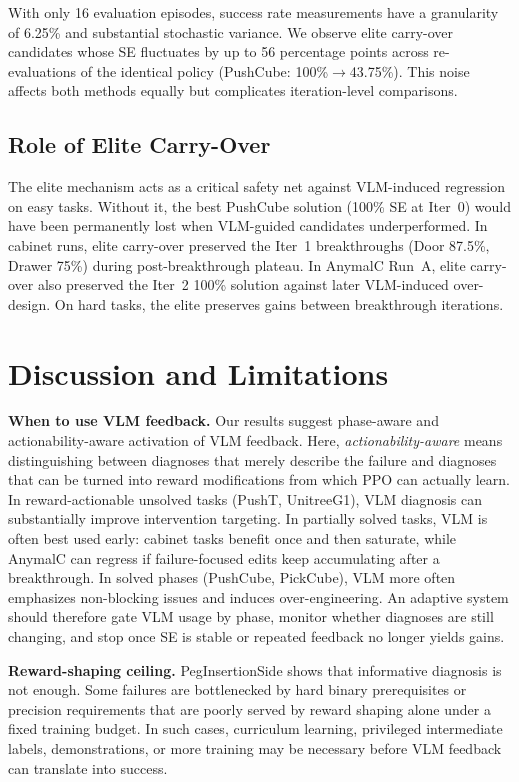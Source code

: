 \documentclass[conference]{IEEEtran}
\begin{document}
With only 16 evaluation episodes, success rate measurements have a granularity
of 6.25\% and substantial stochastic variance. We observe elite carry-over
candidates whose SE fluctuates by up to 56 percentage points across
re-evaluations of the identical policy (PushCube: 100\%$\to$43.75\%). This
noise affects both methods equally but complicates iteration-level comparisons.

\subsection{Role of Elite Carry-Over}

The elite mechanism acts as a critical safety net against VLM-induced regression
on easy tasks. Without it, the best PushCube solution (100\% SE at Iter~0) would
have been permanently lost when VLM-guided candidates underperformed. In cabinet
runs, elite carry-over preserved the Iter~1 breakthroughs (Door 87.5\%, Drawer
75\%) during post-breakthrough plateau. In AnymalC Run~A, elite carry-over also
preserved the Iter~2 100\% solution against later VLM-induced over-design. On
hard tasks, the elite preserves gains between breakthrough iterations.


\section{Discussion and Limitations}

\textbf{When to use VLM feedback.}
Our results suggest phase-aware and actionability-aware activation of VLM
feedback. Here, \emph{actionability-aware} means distinguishing between
diagnoses that merely describe the failure and diagnoses that can be turned into
reward modifications from which PPO can actually learn. In reward-actionable
unsolved tasks (PushT, UnitreeG1), VLM diagnosis can substantially improve
intervention targeting. In partially solved tasks, VLM is often best used
early: cabinet tasks benefit once and then saturate, while AnymalC can regress
if failure-focused edits keep accumulating after a breakthrough. In solved
phases (PushCube, PickCube), VLM more often emphasizes non-blocking issues and
induces over-engineering. An adaptive system should therefore gate VLM usage by
phase, monitor whether diagnoses are still changing, and stop once SE is stable
or repeated feedback no longer yields gains.

\textbf{Reward-shaping ceiling.}
PegInsertionSide shows that informative diagnosis is not enough. Some failures
are bottlenecked by hard binary prerequisites or precision requirements that are
poorly served by reward shaping alone under a fixed training budget. In such
cases, curriculum learning, privileged intermediate labels, demonstrations, or
more training may be necessary before VLM feedback can translate into success.
\end{document}
